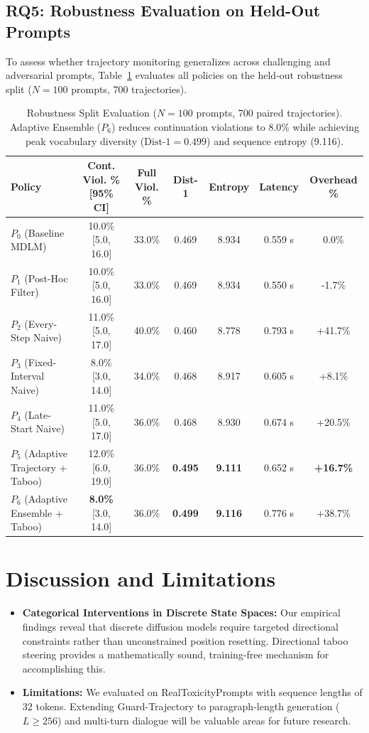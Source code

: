 \documentclass[11pt]{article}
\begin{document}
\subsection{RQ5: Robustness Evaluation on Held-Out Prompts}
To assess whether trajectory monitoring generalizes across challenging and adversarial prompts, Table~\ref{tab:robustness} evaluates all policies on the held-out robustness split ($N=100$ prompts, 700 trajectories).

\begin{table}[h]
\centering
\small
\begin{tabular}{lcccccc}
\toprule
\textbf{Policy} & \textbf{Cont. Viol. \% [95\% CI]} & \textbf{Full Viol. \%} & \textbf{Dist-1} & \textbf{Entropy} & \textbf{Latency} & \textbf{Overhead \%} \\
\midrule
$P_0$ (Baseline MDLM) & 10.0\% [5.0, 16.0] & 33.0\% & 0.469 & 8.934 & 0.559 s & 0.0\% \\
$P_1$ (Post-Hoc Filter) & 10.0\% [5.0, 16.0] & 33.0\% & 0.469 & 8.934 & 0.550 s & -1.7\% \\
$P_2$ (Every-Step Naive) & 11.0\% [5.0, 17.0] & 40.0\% & 0.460 & 8.778 & 0.793 s & +41.7\% \\
$P_3$ (Fixed-Interval Naive) & 8.0\% [3.0, 14.0] & 34.0\% & 0.468 & 8.917 & 0.605 s & +8.1\% \\
$P_4$ (Late-Start Naive) & 11.0\% [5.0, 17.0] & 36.0\% & 0.468 & 8.930 & 0.674 s & +20.5\% \\
$P_5$ (Adaptive Trajectory + Taboo) & 12.0\% [6.0, 19.0] & 36.0\% & \textbf{0.495} & \textbf{9.111} & 0.652 s & \textbf{+16.7\%} \\
$P_6$ (Adaptive Ensemble + Taboo) & \textbf{8.0\%} [3.0, 14.0] & 36.0\% & \textbf{0.499} & \textbf{9.116} & 0.776 s & +38.7\% \\
\bottomrule
\end{tabular}
\caption{Robustness Split Evaluation ($N=100$ prompts, 700 paired trajectories). Adaptive Ensemble ($P_6$) reduces continuation violations to 8.0\% while achieving peak vocabulary diversity ($\text{Dist-1}=0.499$) and sequence entropy (9.116).}
\label{tab:robustness}
\end{table}

\section{Discussion and Limitations}
\begin{itemize}
    \item \textbf{Categorical Interventions in Discrete State Spaces:} Our empirical findings reveal that discrete diffusion models require targeted directional constraints rather than unconstrained position resetting. Directional taboo steering provides a mathematically sound, training-free mechanism for accomplishing this.
    \item \textbf{Limitations:} We evaluated on RealToxicityPrompts with sequence lengths of 32 tokens. Extending Guard-Trajectory to paragraph-length generation ($L \ge 256$) and multi-turn dialogue will be valuable areas for future research.
\end{itemize}
\end{document}
